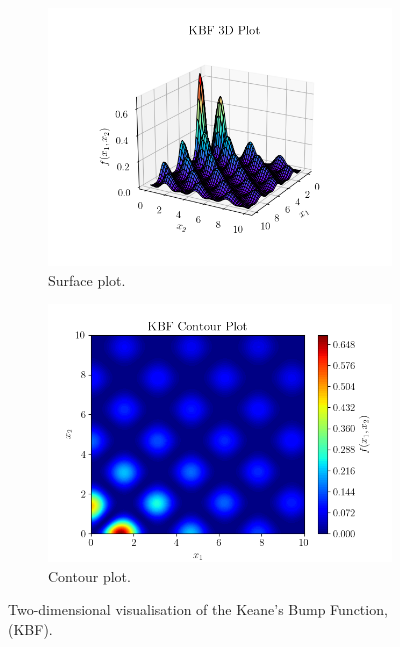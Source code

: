 \documentclass[10pt]{article}
\begin{document}
\begin{figure}[H]
\centering
\begin{subfigure}{0.49\textwidth}
    \centering
    \includegraphics[width=\textwidth]{../figures/KBF/KBF_surf.png}
    \caption{Surface plot.}
    \label{fig:KBF_surf}
\end{subfigure}
\begin{subfigure}{0.49\textwidth}
    \centering
    \includegraphics[width=\textwidth]{../figures/KBF/KBF_contour.png}
    \caption{Contour plot.}
    \label{fig:KBF_contour}
\end{subfigure}
    \captionsetup{justification=centering}
    \caption{Two-dimensional visualisation of the Keane's Bump Function, (KBF).}
    \label{fig:KBF_2D}
\end{figure}
\end{document}
